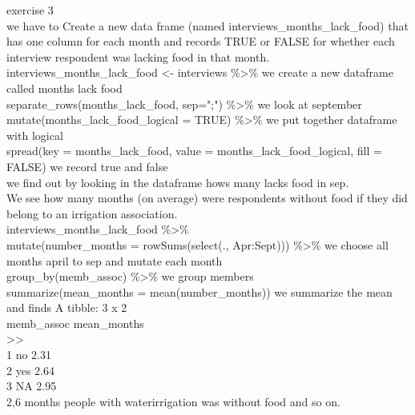 \documentclass{article}
\begin{document}
  exercise 3\\
  we have to Create a new data frame (named interviews\_months\_lack\_food) that has one column for each month and records TRUE or FALSE for whether each interview respondent was lacking food in that month.\\
interviews\_months\_lack\_food \textless- interviews \%\textgreater\%   we create a new dataframe called months lack food\\
  separate\_rows(months\_lack\_food, sep=";") \%\textgreater\%   we look at september\\
  mutate(months\_lack\_food\_logical  = TRUE) \%\textgreater\%   we put together dataframe with logical\\
  spread(key = months\_lack\_food, value = months\_lack\_food\_logical, fill = FALSE)   we record true and false\\
  we find out by looking in the dataframe hows many lacks food in sep.\\
  We see how many months (on average) were respondents without food if they did belong to an irrigation association.\\
interviews\_months\_lack\_food \%\textgreater\%\\
  mutate(number\_months = rowSums(select(., Apr:Sept))) \%\textgreater\%   we choose all months april to sep and mutate each month\\
  group\_by(memb\_assoc) \%\textgreater\%   we group members\\
  summarize(mean\_months = mean(number\_months))   we summarize the mean\\
  and finds A tibble: 3 x 2\\
  memb\_assoc mean\_months\\
  \textlesschr\textgreater            \textlessdbl\textgreater\\
   1 no                2.31\\
  2 yes               2.64\\
  3 NA                2.95\\
  2,6 months people with waterirrigation was without food and so on. \\\\
\end{document}
